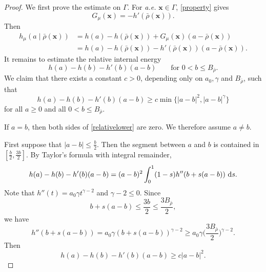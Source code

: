 \documentclass[reqno,11pt]{amsart}
\numberwithin{equation}{section}
\theoremstyle{definition}
\def\dd{{\, \rm d}}
\begin{document}
\begin{proof}
We first prove the estimate on $\Gamma$. For {\it a.e.} $\boldsymbol{x}\in \Gamma$, \eqref{property} gives
\[
G_\mu(\boldsymbol{x})=-h'(\bar\rho(\boldsymbol{x})).
\]
Then
\[
\begin{aligned}
  h_\mu(a\mid\bar\rho(\boldsymbol{x}))
  &=  h(a)-h(\bar\rho(\boldsymbol{x}))
  +G_\mu(\boldsymbol{x})(a-\bar\rho(\boldsymbol{x}))        \\
  &=
 h(a)-h(\bar\rho(\boldsymbol{x})) -h'(\bar\rho(\boldsymbol{x}))(a-\bar\rho(\boldsymbol{x})).
\end{aligned}
\]
It remains to estimate the  relative internal energy
\[
h(a)-h(b)-h'(b)(a-b)
 \qquad \mbox{for $0<b\le B_{\bar{\rho}}$}.
\]
We claim that there exists a constant $c>0$, depending only on
$a_0,\gamma$ and $B_{\bar{\rho}}$, such that
\begin{equation}\label{relativelower}
 h(a)-h(b)-h'(b)(a-b)
  \ge  c\min\{|a-b|^2,|a-b|^\gamma\}
\end{equation}
for all $a\ge0$ and all $0<b\le B_{\bar{\rho}}$.

\smallskip
If $a=b$, then both sides of \eqref{relativelower}
are zero.  We therefore assume $a\ne b$.

\smallskip
First suppose that
  $|a-b|\le \frac b2.$
Then the segment between $a$ and $b$ is contained in
$\left[\frac b2,\frac{3b}{2}\right].$
By Taylor's formula with integral remainder,
\[
  h(a)-h(b)-h'(b)(a-b)
   =
  (a-b)^2
  \int_0^1(1-s)h''(b+s(a-b))\,\dd s.
\]
Note that $h''(t)=a_0\gamma t^{\gamma-2}$ 
and $\gamma-2\leq0$. 
Since
\[
 b+s(a-b)\le \frac{3b}{2}\le \frac{3B_{\bar{\rho}}}{2},
\]
we have
\[
   h''(b+s(a-b))
  =
 a_0\gamma (b+s(a-b))^{\gamma-2}
  \ge
  a_0\gamma \Big(\frac{3B_{\bar{\rho}}}{2}\Big)^{\gamma-2}.
\]
Then
\[
 h(a)-h(b)-h'(b)(a-b)
  \ge  c|a-b|^2 .
\]



\end{proof}
\end{document}
